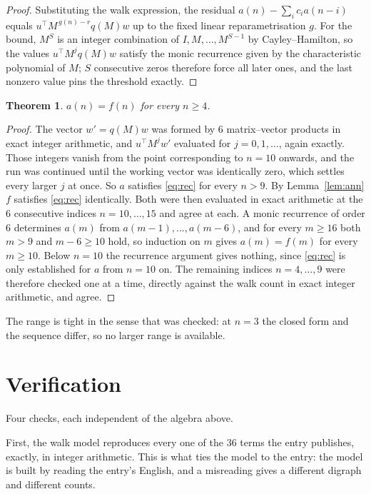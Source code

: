 \documentclass[11pt,a4paper]{article}
\theoremstyle{plain}
\newtheorem{theorem}{Theorem}
\theoremstyle{definition}
\begin{document}
\begin{proof}
Substituting the walk expression, the residual $a(n)-\sum_ic_ia(n-i)$ equals
$u^{\!\top}M^{\,g(n)-r}q(M)w$ up to the fixed linear reparametrisation $g$. For the bound,
$M^{S}$ is an integer combination of $I,M,\dots,M^{S-1}$ by Cayley--Hamilton, so the values
$u^{\!\top}M^{j}q(M)w$ satisfy the monic recurrence given by the characteristic polynomial of
$M$; $S$ consecutive zeros therefore force all later ones, and the last nonzero value pins the
threshold exactly.
\end{proof}

\begin{theorem}
$a(n)=f(n)$ for every $n\ge4$.
\end{theorem}

\begin{proof}
The vector $w'=q(M)w$ was formed by $6$ matrix--vector products in exact integer
arithmetic, and $u^{\!\top}M^{j}w'$ evaluated for $j=0,1,\dots$, again exactly. Those integers
vanish from the point corresponding to $n=10$ onwards, and the run was continued until the
working vector was identically zero, which settles every larger $j$ at once. So $a$ satisfies
\eqref{eq:rec} for every $n>9$. By Lemma~\ref{lem:ann} $f$ satisfies \eqref{eq:rec}
identically. Both were then evaluated in exact arithmetic at the $6$ consecutive indices
$n=10,\dots,15$ and agree at each. A monic recurrence of order $6$
determines $a(m)$ from $a(m-1),\dots,a(m-6)$, and for every $m\ge16$ both
$m>9$ and $m-6\ge10$ hold, so induction on $m$ gives $a(m)=f(m)$ for every
$m\ge10$.
Below $n=10$ the recurrence argument gives nothing, since \eqref{eq:rec} is only
established for $a$ from $n=10$ on. The remaining indices $n=4,\dots,9$ were
therefore checked one at a time, directly against the walk count in exact integer arithmetic,
and agree.
\end{proof}

The range is tight in the sense that was checked: at $n=3$ the closed form and the sequence differ, so no larger range is available.

\section{Verification}

Four checks, each independent of the algebra above.

First, the walk model reproduces every one of the $36$ terms the entry publishes,
exactly, in integer arithmetic. This is what ties the model to the entry: the model is built
by reading the entry's English, and a misreading gives a different digraph and different
counts.
\end{document}
